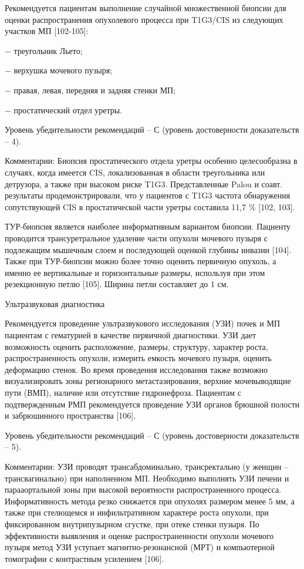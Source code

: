 Рекомендуется пациентам выполнение случайной множественной биопсии для оценки распространения опухолевого процесса при T1G3/CIS из следующих участков МП [102-105]:

− треугольник Льето;

− верхушка мочевого пузыря;

− правая, левая, передняя и задняя стенки МП;

− простатический отдел уретры.

Уровень убедительности рекомендаций – С (уровень достоверности доказательств – 4).

Комментарии: Биопсия простатического отдела уретры особенно целесообразна в случаях, когда имеется CIS, локализованная в области треугольника или детрузора, а также при высоком риске T1G3. Представленные Palou и соавт. результаты продемонстрировали, что у пациентов с T1G3 частота обнаружения сопутствующей CIS в простатической части уретры составила 11,7 \% [102, 103].

ТУР-биопсия является наиболее информативным вариантом биопсии. Пациенту проводится трансуретральное удаление части опухоли мочевого пузыря с подлежащим мышечным слоем и последующей оценкой глубины инвазии [104]. Также при ТУР-биопсии можно более точно оценить первичную опухоль, а именно ее вертикальные и горизонтальные размеры, используя при этом резекционную петлю [105]. Ширина петли составляет до 1 см.

Ультразвуковая диагностика

Рекомендуется проведение ультразвукового исследования (УЗИ) почек и МП пациентам с гематурией в качестве первичной диагностики. УЗИ дает возможность оценить расположение, размеры, структуру, характер роста, распространенность опухоли, измерить емкость мочевого пузыря, оценить деформацию стенок. Во время проведения исследования также возможно визуализировать зоны регионарного метастазирования, верхние мочевыводящие пути (ВМП), наличие или отсутствие гидронефроза. Пациентам с подтвержденным РМП рекомендуется проведение УЗИ органов брюшной полости и забрюшинного пространства [106].

Уровень убедительности рекомендаций – С (уровень достоверности доказательств – 5).

Комментарии: УЗИ проводят трансабдоминально, трансректально (у женщин –трансвагинально) при наполненном МП. Необходимо выполнять УЗИ печени и парааортальной зоны при высокой вероятности распространенного процесса. Информативность метода резко снижается при опухолях размером менее 5 мм, а также при стелющемся и инфильтративном характере роста опухоли, при фиксированном внутрипузырном сгустке, при отеке стенки пузыря. По эффективности выявления и оценке распространенности опухоли мочевого пузыря метод УЗИ уступает магнитно-резонансной (МРТ) и компьютерной томографии с контрастным усилением [106].

